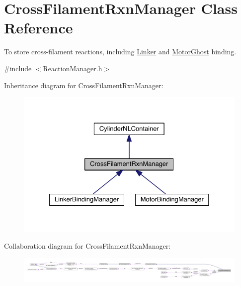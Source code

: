 \hypertarget{classCrossFilamentRxnManager}{\section{Cross\+Filament\+Rxn\+Manager Class Reference}
\label{classCrossFilamentRxnManager}
}


To store cross-\/filament reactions, including \hyperlink{classLinker}{Linker} and \hyperlink{classMotorGhost}{Motor\+Ghost} binding.  




{\ttfamily \#include $<$Reaction\+Manager.\+h$>$}



Inheritance diagram for Cross\+Filament\+Rxn\+Manager\+:\nopagebreak
\begin{figure}[H]
\begin{center}
\leavevmode
\includegraphics[width=328pt]{classCrossFilamentRxnManager__inherit__graph}
\end{center}
\end{figure}


Collaboration diagram for Cross\+Filament\+Rxn\+Manager\+:
\nopagebreak
\begin{figure}[H]
\begin{center}
\leavevmode
\includegraphics[width=350pt]{classCrossFilamentRxnManager__coll__graph}
\end{center}
\end{figure}
